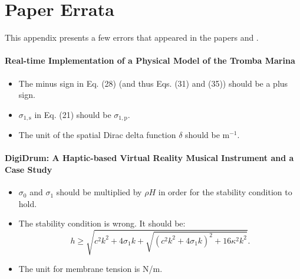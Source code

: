 \chapter{Paper Errata}\label{app:paperErrata}
This appendix presents a few errors that appeared in the papers \citeP[D] and \citeP[F].
\subsubsection{Real-time Implementation of a Physical Model of the Tromba Marina \citeP[D]}
\begin{itemize}
    \item The minus sign in Eq. (28) (and thus Eqs. (31) and (35)) should be a plus sign.
    \item $\sigma_{1,\text{s}}$ in Eq. (21) should be $\sigma_{1,\text{p}}$.
    \item The unit of the spatial Dirac delta function $\delta$ should be m$^{-1}$.
\end{itemize}
%
\subsubsection{DigiDrum: A Haptic-based Virtual Reality Musical Instrument and a Case Study \citeP[F]}
\begin{itemize}
    \item $\sigma_0$ and $\sigma_1$ should be multiplied by $\rho H$ in order for the stability condition to hold.
    \item The stability condition is wrong. It should be: 
    \begin{equation}
        h \geq \sqrt{c^2k^2 + 4\sigma_1k + \sqrt{(c^2k^2+4\sigma_1k)^2 + 16\kappa^2k^2}}.
    \end{equation}
    \item The unit for membrane tension is N/m.
\end{itemize}
